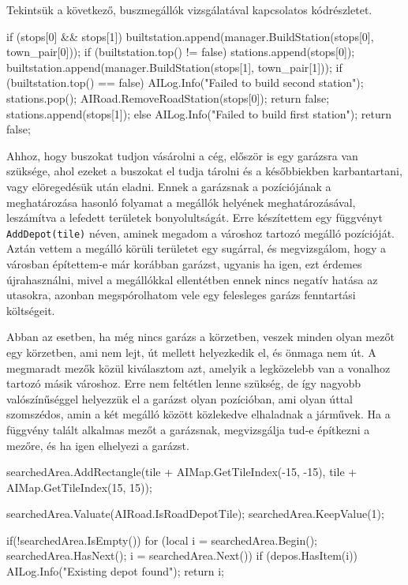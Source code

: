 Tekintsük a következő, buszmegállók vizsgálatával kapcsolatos kódrészletet.
\begin{cpp}
if (stops[0] && stops[1]) {
  builtstation.append(manager.BuildStation(stops[0], town_pair[0]));
  if (builtstation.top() != false) {
    stations.append(stops[0]);
    builtstation.append(manager.BuildStation(stops[1], town_pair[1]));
    if (builtstation.top() == false) {
      AILog.Info("Failed to build second station");
      stations.pop();
      AIRoad.RemoveRoadStation(stops[0]);
      return false;
    }
    stations.append(stops[1]);
  } else {
    AILog.Info("Failed to build first station");
    return false;
  }
} 
\end{cpp}
Ahhoz, hogy buszokat tudjon vásárolni a cég, először is egy garázsra van szüksége, ahol ezeket a buszokat el tudja tárolni és a későbbiekben karbantartani, vagy elöregedésük után eladni. Ennek a garázsnak a pozíciójának a meghatározása hasonló folyamat a megállók helyének meghatározásával, leszámítva a lefedett területek bonyolultságát. Erre készítettem egy függvényt \texttt{AddDepot(tile)} néven, aminek megadom a városhoz tartozó megálló pozícióját. Aztán vettem a megálló körüli területet egy sugárral, és megvizsgálom, hogy a városban építettem-e már korábban garázst, ugyanis ha igen, ezt érdemes újrahasználni, mivel a megállókkal ellentétben ennek nincs negatív hatása az utasokra, azonban megspórolhatom vele egy felesleges garázs fenntartási költségeit.

Abban az esetben, ha még nincs garázs a körzetben, veszek minden olyan mezőt egy körzetben, ami nem lejt, út mellett helyezkedik el, és önmaga nem út. A megmaradt mezők közül kiválasztom azt, amelyik a legközelebb van a vonalhoz tartozó másik városhoz. Erre nem feltétlen lenne szükség, de így nagyobb valószínűséggel helyezzük el a garázst olyan pozícióban, ami olyan úttal szomszédos, amin a két megálló között közlekedve elhaladnak a járművek. Ha a függvény talált alkalmas mezőt a garázsnak, megvizsgálja tud-e építkezni a mezőre, és ha igen elhelyezi a garázst.
\begin{cpp}
searchedArea.AddRectangle(tile + AIMap.GetTileIndex(-15, -15),
 tile + AIMap.GetTileIndex(15, 15));

searchedArea.Valuate(AIRoad.IsRoadDepotTile);
searchedArea.KeepValue(1);

if(!searchedArea.IsEmpty()) {
  for (local i = searchedArea.Begin(); 
   searchedArea.HasNext(); i = searchedArea.Next()) {
    if (depos.HasItem(i)) {
      AILog.Info("Existing depot found");
      return i;
    }
  }
}
\end{cpp}

